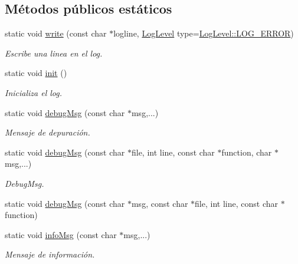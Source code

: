 \subsection*{Métodos públicos estáticos}
\begin{DoxyCompactItemize}
\item 
static void \hyperlink{class_i3_d_1_1_log_msg_a71c24601dd2d2ff79422e1dc718ae722}{write} (const char $\ast$logline, \hyperlink{namespace_i3_d_ae1af0f2e3b629610c45222809ff521f6}{Log\+Level} type=\hyperlink{namespace_i3_d_ae1af0f2e3b629610c45222809ff521f6a4490aa3d29644e716440fada68f54032}{Log\+Level\+::\+L\+O\+G\+\_\+\+E\+R\+R\+OR})
\begin{DoxyCompactList}\small\item\em Escribe una linea en el log. \end{DoxyCompactList}\item 
static void \hyperlink{class_i3_d_1_1_log_msg_a147319e07090ca301b9ade50125aa13b}{init} ()
\begin{DoxyCompactList}\small\item\em Inicializa el log. \end{DoxyCompactList}\item 
static void \hyperlink{class_i3_d_1_1_log_msg_a1070a37a80fbd7a1ecb7380b0740b4bb}{debug\+Msg} (const char $\ast$msg,...)
\begin{DoxyCompactList}\small\item\em Mensaje de depuración. \end{DoxyCompactList}\item 
static void \hyperlink{class_i3_d_1_1_log_msg_a2ae82253f8773af3755673ce3c234ff5}{debug\+Msg} (const char $\ast$file, int line, const char $\ast$function, char $\ast$msg,...)
\begin{DoxyCompactList}\small\item\em Debug\+Msg. \end{DoxyCompactList}\item 
static void \hyperlink{class_i3_d_1_1_log_msg_a23e6ff7503a9e5d90c91272f59fd48f1}{debug\+Msg} (const char $\ast$msg, const char $\ast$file, int line, const char $\ast$function)
\item 
static void \hyperlink{class_i3_d_1_1_log_msg_a0d60f1ce32bf0ab4a3f22f8e53479122}{info\+Msg} (const char $\ast$msg,...)
\begin{DoxyCompactList}\small\item\em Mensaje de información. \end{DoxyCompactList}\item 

\end{DoxyCompactItemize}
